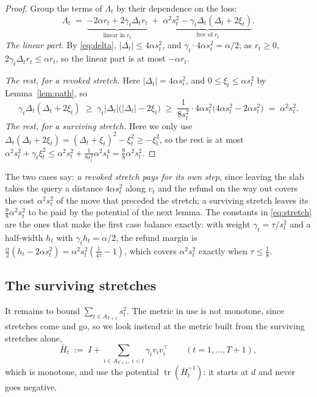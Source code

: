 \documentclass[11pt]{article}
\theoremstyle{plain}
\theoremstyle{definition}
\theoremstyle{remark}
\DeclareMathOperator{\tr}{tr}
\begin{document}
\begin{proof}
Group the terms of $\Lambda_t$ by their dependence on the loss:
\[
  \Lambda_t\;=\;\underbrace{-2\alpha r_t+2\gamma_t\Delta_tr_t}_{\text{linear in }r_t}
  \;+\;\underbrace{\alpha^{2}s_t^{2}-\gamma_t\Delta_t(\Delta_t+2\xi_t)}_{\text{free of }r_t} .
\]
\emph{The linear part.} By \eqref{eq:delta}, $|\Delta_t|\le4\alpha s_t^{2}$, and
$\gamma_t\cdot4\alpha s_t^{2}=\alpha/2$; as $r_t\ge0$, $2\gamma_t\Delta_tr_t\le\alpha r_t$, so the
linear part is at most $-\alpha r_t$.

\emph{The rest, for a revoked stretch.} Here $|\Delta_t|=4\alpha s_t^{2}$, and
$0\le\xi_t\le\alpha s_t^{2}$ by Lemma~\ref{lem:path}, so
\[
  \gamma_t\Delta_t(\Delta_t+2\xi_t)\;\ge\;\gamma_t|\Delta_t|\bigl(|\Delta_t|-2\xi_t\bigr)
  \;\ge\;\frac{1}{8s_t^{2}}\cdot4\alpha s_t^{2}\bigl(4\alpha s_t^{2}-2\alpha s_t^{2}\bigr)
  \;=\;\alpha^{2}s_t^{2} .
\]
\emph{The rest, for a surviving stretch.} Here we only use
$\Delta_t(\Delta_t+2\xi_t)=(\Delta_t+\xi_t)^{2}-\xi_t^{2}\ge-\xi_t^{2}$, so the rest is at most
$\alpha^{2}s_t^{2}+\gamma_t\xi_t^{2}\le\alpha^{2}s_t^{2}+\tfrac{1}{8s_t^{2}}\alpha^{2}s_t^{4}
=\tfrac98\alpha^{2}s_t^{2}$.
\end{proof}

The two cases say: \emph{a revoked stretch pays for its own step}, since leaving the slab takes the
query a distance $4\alpha s_t^{2}$ along $v_t$ and the refund on the way out covers the cost
$\alpha^{2}s_t^{2}$ of the move that preceded the stretch; a surviving stretch leaves its
$\tfrac98\alpha^{2}s_t^{2}$ to be paid by the potential of the next lemma. The constants in
\eqref{eq:stretch} are the ones that make the first case balance exactly: with weight
$\gamma_t=\tau/s_t^{2}$ and a half-width $h_t$ with $\gamma_th_t=\alpha/2$, the refund margin is
$\tfrac{\alpha}{2}(h_t-2\alpha s_t^{2})=\alpha^{2}s_t^{2}(\tfrac{1}{4\tau}-1)$, which covers
$\alpha^{2}s_t^{2}$ exactly when $\tau\le\tfrac18$.

\subsection{The surviving stretches}\label{sec:pot}

It remains to bound $\sum_{t\in A_{T+1}}s_t^{2}$. The metric in use is not monotone, since stretches
come and go, so we look instead at the metric built from the surviving stretches alone,
\[
  \bar H_t\;:=\;I+\sum_{i\in A_{T+1},\ i<t}\gamma_iv_iv_i^{\top}\qquad(t=1,\dots,T+1) ,
\]
which is monotone, and use the potential $\tr(\bar H_t^{-1})$: it starts at $d$ and never goes
negative.
\end{document}
